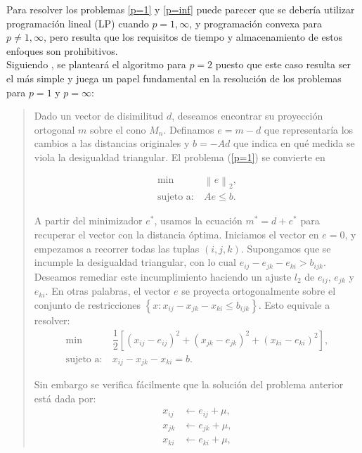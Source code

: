 \documentclass[12pt]{report} %
\theoremstyle{definition}
\newcommand{\norm}[1]{\left\lVert#1\right\rVert}
\begin{document}
{Para resolver los problemas \eqref{p=1} y \eqref{p=inf} puede parecer que se debería utilizar programación lineal (LP) cuando $p=1,\infty$, y programación convexa para $p\neq 1,\infty$, pero resulta que los requisitos de tiempo y almacenamiento de estos enfoques son prohibitivos.\cite{TheMetricNearnessProblem}\\

Siguiendo \cite{TheMetricNearnessProblem}, se planteará el algoritmo para $p=2$ puesto que este caso resulta ser el más simple y juega un papel fundamental en la resolución de los problemas para $p=1$ y $p=\infty$:

\begin{quotation}
Dado un vector de disimilitud $d$, deseamos encontrar su proyección ortogonal $m$ sobre el cono $M_n$. Definamos $e=m-d$ que representaría los cambios a las distancias originales y $b = -Ad$ que indica en qué medida se viola la desigualdad triangular. El problema (\ref{p=1}) se convierte en

\begin{equation} \label{problema}
\begin{aligned}
	\min &\: \norm{e}_2, \\
	\text{sujeto a:} &\: Ae \leq b.
\end{aligned}
\end{equation}

A partir del minimizador $e^*$, usamos la ecuación $m^* = d + e^*$ para recuperar el vector con la distancia óptima. Iniciamos el vector en $e=0$, y empezamos a recorrer todas las tuplas $(i,j,k)$. Supongamos que se incumple la desigualdad triangular, con lo cual $e_{ij}-e_{jk}-e_{ki} > b_{ijk}$. Deseamos remediar este incumplimiento haciendo un ajuste $l_2$ de $e_{ij}$, $e_{jk}$ y $e_{ki}$. En otras palabras, el vector $e$ se proyecta ortogonalmente sobre el conjunto de restricciones $\left\lbrace x : x_{ij} - x_{jk} - x_{ki} \leq b_{ijk} \right\rbrace $. Esto equivale a resolver:
\begin{equation}
\begin{aligned}
\min &\: \dfrac{1}{2}\left[ (x_{ij}-e_{ij})^2 + (x_{jk}-e_{jk})^2 + (x_{ki}-e_{ki})^2 \right],  \\
\text{sujeto a:} &\: x_{ij} - x_{jk} - x_{ki}=b.
\end{aligned}
\end{equation}

Sin embargo se verifica fácilmente que la solución del problema anterior está dada por:
\begin{equation} \label{sol}
\begin{aligned}
	x_{ij} &\leftarrow e_{ij} + \mu, \\
	x_{jk} &\leftarrow e_{jk} + \mu, \\
	x_{ki} &\leftarrow e_{ki} + \mu,
\end{aligned}
\end{equation}


\end{quotation}}
\end{document}
